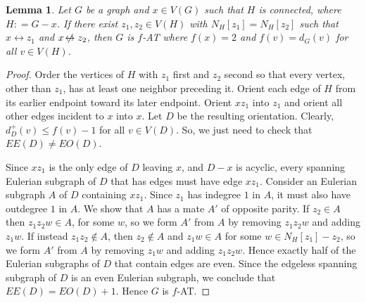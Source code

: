 \documentclass[12pt]{article}
\theoremstyle{plain}
\newtheorem{lem}[thm]{Lemma}
\theoremstyle{definition}
\theoremstyle{remark}
\newcommand{\DefinedAs}{\mathrel{\mathop:}=}
\def\adj{\leftrightarrow}
\def\nonadj{\not\!\leftrightarrow}
\begin{document}
\begin{lem}\label{GeneralEulerLemma}
Let $G$ be a graph and $x \in V(G)$ such that $H$ is connected, where $H \DefinedAs G-x$. 
If there exist $z_1, z_2 \in V(H)$ with $N_H[z_1] = N_H[z_2]$ such that $x \adj
z_1$ and $x \nonadj z_2$, then $G$ is $f$-AT where $f(x) = 2$ and $f(v) =
d_G(v)$ for all $v \in V(H)$.
\end{lem}
\begin{proof}
Order the vertices of $H$ with $z_1$ first and $z_2$ second so that every
vertex, other than $z_1$, has at least one neighbor preceding it. 
Orient each edge of $H$ from its earlier endpoint toward its later endpoint. 
Orient $xz_1$ into $z_1$ and orient all other
edges incident to $x$ into $x$.  Let $D$ be the resulting orientation. 
Clearly, $d_{D}^+(v) \le f(v) - 1$ for all $v \in V(D)$.  So, we just need to
check that $EE(D) \ne EO(D)$.  

Since $xz_1$ is the only edge of $D$ leaving
$x$, and $D-x$ is acyclic, every spanning Eulerian subgraph of $D$ that has
edges must have edge $xz_1$.  
%
Consider an Eulerian subgraph $A$ of $D$ containing $xz_1$. Since $z_1$ %
has indegree $1$ in $A$, it must also have outdegree $1$ in $A$.  We show
that $A$ has a mate $A'$ of opposite parity.  
%
If $z_2 \in A$ then $z_1z_2w \in A$, for some $w$, so we form
$A'$ from $A$ by removing $z_1z_2w$ and adding $z_1w$. 
If instead $z_1z_2\notin A$, then $z_2 \not \in A$ and $z_1w \in
A$ for some $w \in N_H[z_1]-z_2$, so we form $A'$ from $A$ by removing $z_1w$ and
adding $z_1z_2w$.  
%
Hence exactly half of the Eulerian subgraphs of $D$ that contain edges are
even.  Since the edgeless spanning subgraph of $D$ is an even Eulerian
subgraph, we conclude that $EE(D) = EO(D) + 1$.  Hence $G$ is $f$-AT.
\end{proof}
\end{document}
